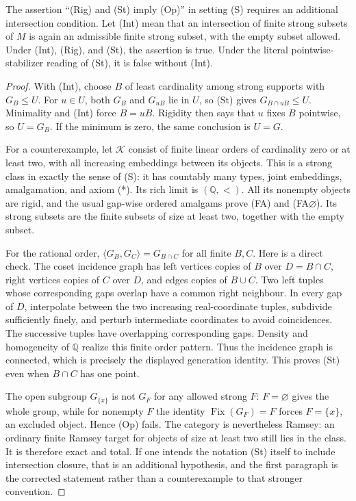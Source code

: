 \begin{proposition}
\label{B:intersection}
The assertion ``(Rig) and (St) imply (Op)'' in setting (S) requires
an additional intersection condition. Let (Int) mean that an
intersection of finite strong subsets of $M$ is again an admissible
finite strong subset, with the empty subset allowed. Under (Int),
(Rig), and (St), the assertion is true. Under the literal
pointwise-stabilizer reading of (St), it is false without (Int).
\end{proposition}
\begin{proof}
With (Int), choose $B$ of least cardinality among strong supports
with $G_B\leq U$. For $u\in U$, both $G_B$ and $G_{uB}$ lie in $U$,
so (St) gives $G_{B\cap uB}\leq U$. Minimality and (Int) force
$B=uB$. Rigidity then says that $u$ fixes $B$ pointwise, so
$U=G_B$. If the minimum is zero, the same conclusion is $U=G$.

For a counterexample, let $\mathcal K$ consist of finite linear
orders of cardinality zero or at least two, with all increasing
embeddings between its objects. This is a strong class in exactly
the sense of (S): it has countably many types, joint embeddings,
amalgamation, and axiom (*). Its rich limit is $(\mathbb Q,<)$.
All its nonempty objects are rigid, and the usual gap-wise ordered
amalgams prove (FA) and (FA$\varnothing$). Its strong subsets are
the finite subsets of size at least two, together with the empty
subset.

For the rational order, $\langle G_B,G_C\rangle=G_{B\cap C}$ for
all finite $B,C$. Here is a direct check. The coset incidence graph
has left vertices copies of $B$ over $D=B\cap C$, right vertices
copies of $C$ over $D$, and edges copies of $B\cup C$. Two left
tuples whose corresponding gaps overlap have a common right
neighbour. In every gap of $D$, interpolate between the two
increasing real-coordinate tuples, subdivide sufficiently finely,
and perturb intermediate coordinates to avoid coincidences. The
successive tuples have overlapping corresponding gaps. Density and
homogeneity of $\mathbb Q$ realize this finite order pattern. Thus
the incidence graph is connected, which is precisely the displayed
generation identity. This proves (St) even when $B\cap C$ has
one point.

The open subgroup $G_{\{x\}}$ is not $G_F$ for any allowed strong
$F$: $F=\varnothing$ gives the whole group, while for nonempty $F$
the identity $\operatorname{Fix}(G_F)=F$ forces $F=\{x\}$, an
excluded object. Hence (Op) fails. The category is nevertheless
Ramsey: an ordinary finite Ramsey target for objects of size at
least two still lies in the class. It is therefore exact and total.
If one intends the notation (St) itself to include intersection
closure, that is an additional hypothesis, and the first paragraph
is the corrected statement rather than a counterexample to that
stronger convention.
\end{proof}

